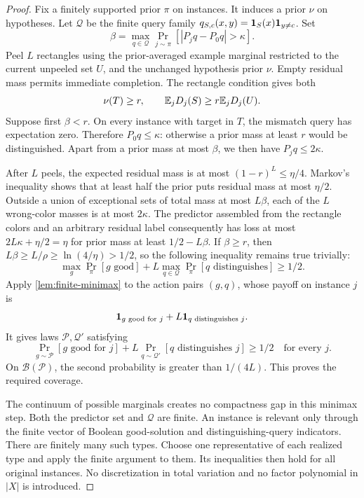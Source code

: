 \begin{proof}
Fix a finitely supported prior $\pi$ on instances. It induces a prior $\nu$ on hypotheses. Let $\mathcal Q$ be the finite query family $q_{S,c}(x,y)=\mathbf 1_S(x)\mathbf 1_{y\ne c}$. Set
\[
 \beta=\max_{q\in\mathcal Q}\Pr_{j\sim\pi}[|P_jq-P_0q|>\kappa].
\]
Peel $L$ rectangles using the prior-averaged example marginal restricted to the current unpeeled set $U$, and the unchanged hypothesis prior $\nu$. Empty residual mass permits immediate completion. The rectangle condition gives both
\[
 \nu(T)\ge r,\qquad \mathbb E_jD_j(S)\ge r\mathbb E_jD_j(U).
\]
Suppose first $\beta<r$. On every instance with target in $T$, the mismatch query has expectation zero. Therefore $P_0q\le\kappa$: otherwise a prior mass at least $r$ would be distinguished. Apart from a prior mass at most $\beta$, we then have $P_jq\le2\kappa$.

After $L$ peels, the expected residual mass is at most $(1-r)^L\le\eta/4$. Markov's inequality shows that at least half the prior puts residual mass at most $\eta/2$. Outside a union of exceptional sets of total mass at most $L\beta$, each of the $L$ wrong-color masses is at most $2\kappa$. The predictor assembled from the rectangle colors and an arbitrary residual label consequently has loss at most $2L\kappa+\eta/2=\eta$ for prior mass at least $1/2-L\beta$. If $\beta\ge r$, then $L\beta\ge L/\rho\ge\ln(4/\eta)>1/2$, so the following inequality remains true trivially:
\begin{equation}\label{eq:additive-game}
 \max_g\Pr_\pi[g\text{ good}]+L\max_{q\in\mathcal Q}\Pr_\pi[q\text{ distinguishes}]\ge1/2.
\end{equation}
Apply \cref{lem:finite-minimax} to the action pairs $(g,q)$, whose payoff on instance $j$ is
\[
 \mathbf 1_{g\text{ good for }j}+L\mathbf 1_{q\text{ distinguishes }j}.
\]
It gives laws $\mathcal P,\mathcal Q'$ satisfying
\[
 \Pr_{g\sim\mathcal P}[g\text{ good for }j]
 +L\Pr_{q\sim\mathcal Q'}[q\text{ distinguishes }j]\ge1/2
 \quad\text{for every }j.
\]
On $\mathcal B(\mathcal P)$, the second probability is greater than $1/(4L)$. This proves the required coverage.

The continuum of possible marginals creates no compactness gap in this minimax step. Both the predictor set and $\mathcal Q$ are finite. An instance is relevant only through the finite vector of Boolean good-solution and distinguishing-query indicators. There are finitely many such types. Choose one representative of each realized type and apply the finite argument to them. Its inequalities then hold for all original instances. No discretization in total variation and no factor polynomial in $|X|$ is introduced.
\end{proof}

